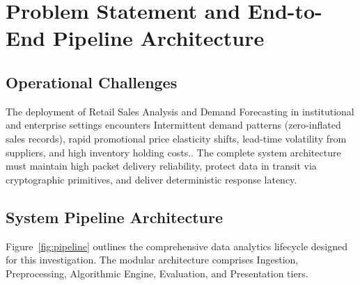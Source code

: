 \section{Problem Statement and End-to-End Pipeline Architecture}

\subsection{Operational Challenges}
The deployment of Retail Sales Analysis and Demand Forecasting in institutional and enterprise settings encounters Intermittent demand patterns (zero-inflated sales records), rapid promotional price elasticity shifts, lead-time volatility from suppliers, and high inventory holding costs.. The complete system architecture must maintain high packet delivery reliability, protect data in transit via cryptographic primitives, and deliver deterministic response latency.

\subsection{System Pipeline Architecture}
Figure~\ref{fig:pipeline} outlines the comprehensive data analytics lifecycle designed for this investigation. The modular architecture comprises Ingestion, Preprocessing, Algorithmic Engine, Evaluation, and Presentation tiers.

